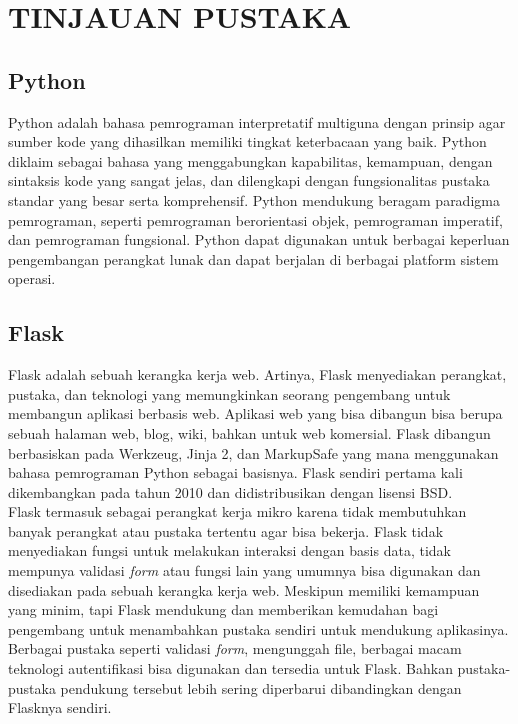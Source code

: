 \chapter{TINJAUAN PUSTAKA}
\section{Python}
Python adalah bahasa pemrograman interpretatif multiguna dengan prinsip agar sumber kode yang dihasilkan memiliki tingkat keterbacaan yang baik. Python diklaim sebagai bahasa yang menggabungkan kapabilitas, kemampuan, dengan sintaksis kode yang sangat jelas, dan dilengkapi dengan fungsionalitas pustaka standar yang besar serta komprehensif. Python mendukung beragam paradigma pemrograman, seperti pemrograman berorientasi objek, pemrograman imperatif, dan pemrograman fungsional. Python dapat digunakan untuk berbagai keperluan pengembangan perangkat lunak dan dapat berjalan di berbagai platform sistem operasi. \cite{bab2-python}

\section{Flask}
Flask adalah sebuah kerangka kerja web. Artinya, Flask menyediakan perangkat, pustaka, dan teknologi yang memungkinkan seorang pengembang untuk membangun aplikasi berbasis web. Aplikasi web yang bisa dibangun bisa berupa sebuah halaman web, blog, wiki, bahkan untuk web komersial. Flask dibangun berbasiskan pada Werkzeug, Jinja 2, dan MarkupSafe yang mana menggunakan bahasa pemrograman Python sebagai basisnya. Flask sendiri pertama kali dikembangkan pada tahun 2010 dan didistribusikan dengan lisensi BSD. \cite{bab2-flask} \\
\indent Flask termasuk sebagai perangkat kerja mikro karena tidak membutuhkan banyak perangkat atau pustaka tertentu agar bisa bekerja. Flask tidak menyediakan fungsi untuk melakukan interaksi dengan basis data, tidak mempunya validasi \textit{form} atau fungsi lain yang umumnya bisa digunakan dan disediakan pada sebuah kerangka kerja web. Meskipun memiliki kemampuan yang minim, tapi Flask mendukung dan memberikan kemudahan bagi pengembang untuk menambahkan pustaka sendiri untuk mendukung aplikasinya. Berbagai pustaka seperti validasi \textit{form}, mengunggah file, berbagai macam teknologi autentifikasi bisa digunakan dan tersedia untuk Flask. Bahkan pustaka-pustaka pendukung tersebut lebih sering diperbarui dibandingkan dengan Flasknya sendiri.

